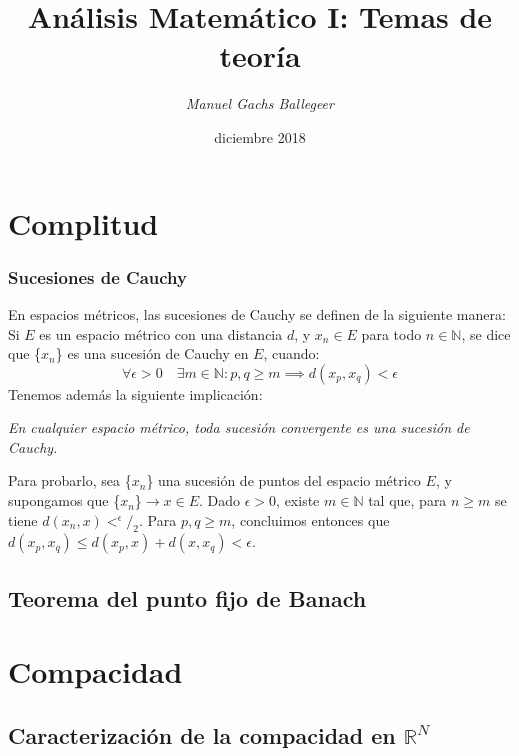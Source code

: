 \documentclass[11pt,titlepage,a4paper]{article}
\begin{document}
\title{\Huge{\textbf{Análisis Matemático I: Temas de teoría}}}
\author{\textit{Manuel Gachs Ballegeer}}
\date{diciembre 2018}
\maketitle

\tableofcontents
\clearpage

\section{Complitud}
\subsubsection*{Sucesiones de Cauchy}
En espacios métricos, las sucesiones de Cauchy se definen de la siguiente manera: Si $E$ es un espacio 
métrico con una distancia $d$, y $x_n\in E$ para todo $n\in \mathbb{N}$, se dice que \{$x_n$\} es una sucesión de Cauchy 
en $E$, cuando:
\begin{equation*}
\forall\epsilon>0\quad\exists m\in\mathbb{N}:p,q\geq m\implies d(x_p,x_q)<\epsilon
\end{equation*}
Tenemos además la siguiente implicación:
\begin{center}
\textit{En cualquier espacio métrico, toda sucesión convergente es una sucesión de Cauchy.}
\end{center}
Para probarlo, sea \{$x_n$\} una sucesión de puntos del espacio métrico $E$, y supongamos que 
\{$x_n$\}$\rightarrow x\in E$. Dado $\epsilon>0$, existe $m\in\mathbb{N}$ tal que, para $n\geq m$ se tiene 
$d(x_n,x)<^\epsilon/_2$. Para $p,q\geq m$, concluimos entonces que $d(x_p,x_q)\leq d(x_p,x)+d(x,x_q)<\epsilon$.

\subsection{Teorema del punto fijo de Banach}
\section{Compacidad}
\subsection{Caracterización de la compacidad en \textbf{$\mathbb{R}^N$}}
\end{document}
